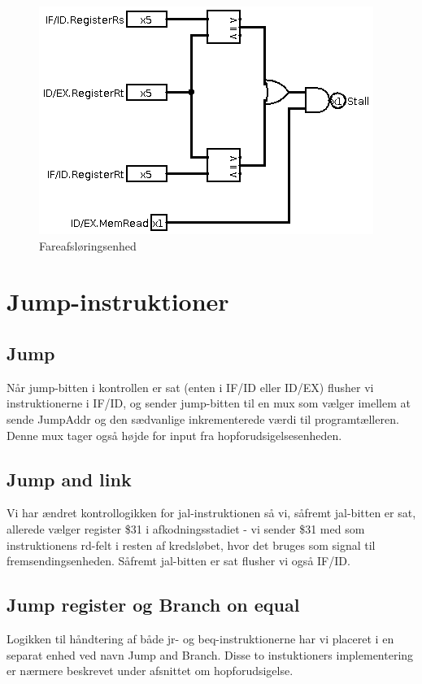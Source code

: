 \documentclass[10pt,a4paper,danish]{article}
\begin{document}
\begin{figure}[htb]
\begin{center}
\leavevmode
\includegraphics[scale=0.70]{hazard_detection_unit.png}
\end{center}
\caption{Fareafsløringsenhed}
\label{fig:hdu} 
\end{figure}

\section{Jump-instruktioner}

\subsection{Jump}
Når jump-bitten i kontrollen er sat (enten i IF/ID eller ID/EX) flusher vi 
instruktionerne i IF/ID, og sender jump-bitten til en mux som vælger imellem
at sende JumpAddr og den sædvanlige inkrementerede værdi til programtælleren.
Denne mux tager også højde for input fra hopforudsigelsesenheden. 

\subsection{Jump and link}
Vi har ændret kontrollogikken for jal-instruktionen så vi, såfremt
jal-bitten er sat, allerede vælger register \$31 i afkodningsstadiet
 - vi sender \$31 med som instruktionens rd-felt i resten af kredsløbet,
hvor det bruges som signal til fremsendingsenheden. Såfremt jal-bitten 
er sat flusher vi også IF/ID. 

\subsection{Jump register og Branch on equal}
Logikken til håndtering af både jr- og beq-instruktionerne har vi 
placeret i en separat enhed ved navn Jump and Branch. Disse to 
instuktioners implementering er nærmere beskrevet under afsnittet
om hopforudsigelse. 
\end{document}
